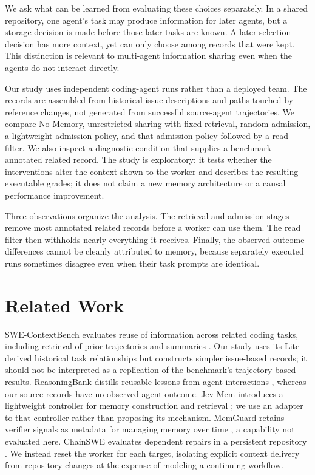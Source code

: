 \documentclass[sigconf,anonymous]{aamas}
\begin{document}
We ask what can be learned from evaluating these choices separately. In a shared repository, one agent's task may produce information for later agents, but a storage decision is made before those later tasks are known. A later selection decision has more context, yet can only choose among records that were kept. This distinction is relevant to multi-agent information sharing even when the agents do not interact directly.

Our study uses independent coding-agent runs rather than a deployed team. The records are assembled from historical issue descriptions and paths touched by reference changes, not generated from successful source-agent trajectories. We compare No Memory, unrestricted sharing with fixed retrieval, random admission, a lightweight admission policy, and that admission policy followed by a read filter. We also inspect a diagnostic condition that supplies a benchmark-annotated related record. The study is exploratory: it tests whether the interventions alter the context shown to the worker and describes the resulting executable grades; it does not claim a new memory architecture or a causal performance improvement.

Three observations organize the analysis. The retrieval and admission stages remove most annotated related records before a worker can use them. The read filter then withholds nearly everything it receives. Finally, the observed outcome differences cannot be cleanly attributed to memory, because separately executed runs sometimes disagree even when their task prompts are identical.

\section{Related Work}
SWE-ContextBench evaluates reuse of information across related coding tasks, including retrieval of prior trajectories and summaries \cite{zhu2026swecontext}. Our study uses its Lite-derived historical task relationships but constructs simpler issue-based records; it should not be interpreted as a replication of the benchmark's trajectory-based results. ReasoningBank distills reusable lessons from agent interactions \cite{ouyang2025reasoningbank}, whereas our source records have no observed agent outcome. Jev-Mem introduces a lightweight controller for memory construction and retrieval \cite{jiang2026jevmem}; we use an adapter to that controller rather than proposing its mechanism. MemGuard retains verifier signals as metadata for managing memory over time \cite{wang2026memguard}, a capability not evaluated here. ChainSWE evaluates dependent repairs in a persistent repository \cite{jin2026chainswe}. We instead reset the worker for each target, isolating explicit context delivery from repository changes at the expense of modeling a continuing workflow.
\end{document}
